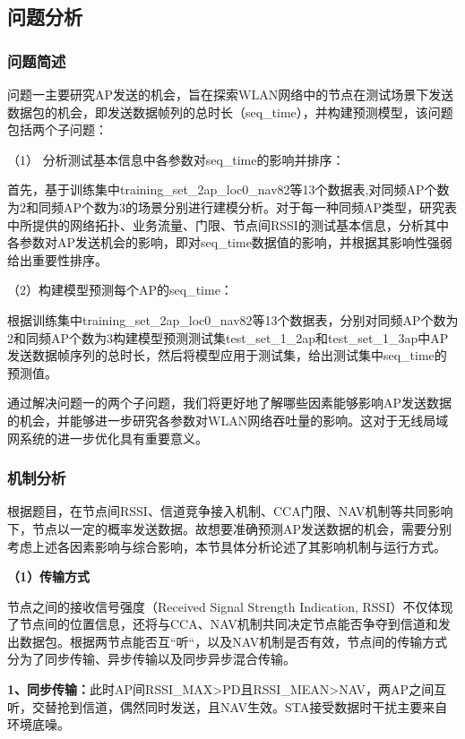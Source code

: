 \documentclass[bwprint]{gmcmthesis}
\begin{document}
\subsection{问题分析}
\subsubsection{问题简述}
问题一主要研究AP发送的机会，旨在探索WLAN网络中的节点在测试场景下发送数据包的机会，即发送数据帧列的总时长（seq\_time），并构建预测模型，该问题包括两个子问题：

（1） 分析测试基本信息中各参数对seq\_time的影响并排序：

首先，基于训练集中training\_set\_2ap\_loc0\_nav82等13个数据表,对同频AP个数为2和同频AP个数为3的场景分别进行建模分析。对于每一种同频AP类型，研究表中所提供的网络拓扑、业务流量、门限、节点间RSSI的测试基本信息，分析其中各参数对AP发送机会的影响，即对seq\_time数据值的影响，并根据其影响性强弱给出重要性排序。

（2）构建模型预测每个AP的seq\_time：

根据训练集中training\_set\_2ap\_loc0\_nav82等13个数据表，分别对同频AP个数为2和同频AP个数为3构建模型预测测试集test\_set\_1\_2ap和test\_set\_1\_3ap中AP发送数据帧序列的总时长，然后将模型应用于测试集，给出测试集中seq\_time的预测值。 

通过解决问题一的两个子问题，我们将更好地了解哪些因素能够影响AP发送数据的机会，并能够进一步研究各参数对WLAN网络吞吐量的影响。这对于无线局域网系统的进一步优化具有重要意义。



\subsubsection{机制分析}
根据题目，在节点间RSSI、信道竞争接入机制、CCA门限、NAV机制等共同影响下，节点以一定的概率发送数据。故想要准确预测AP发送数据的机会，需要分别考虑上述各因素影响与综合影响，本节具体分析论述了其影响机制与运行方式。

\textbf{（1）传输方式}

节点之间的接收信号强度（Received Signal Strength Indication, RSSI）不仅体现了节点间的位置信息，还将与CCA、NAV机制共同决定节点能否争夺到信道和发出数据包。根据两节点能否互“听“，以及NAV机制是否有效，节点间的传输方式分为了同步传输、异步传输以及同步异步混合传输。


\textbf{1、同步传输：}此时AP间RSSI\_MAX>PD且RSSI\_MEAN>NAV，两AP之间互听，交替抢到信道，偶然同时发送，且NAV生效。STA接受数据时干扰主要来自环境底噪。
\end{document}
